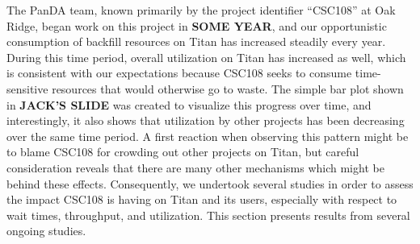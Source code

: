 

The PanDA team, known primarily by the project identifier ``CSC108'' at Oak
Ridge, began work on this project in \textbf{SOME YEAR}, and our opportunistic
consumption of backfill resources on Titan has increased steadily every year.
During this time period, overall utilization on Titan has increased as well,
which is consistent with our expectations because CSC108 seeks to consume
time-sensitive resources that would otherwise go to waste. The simple bar plot
shown in \textbf{JACK'S SLIDE} was created to visualize this progress over
time, and interestingly, it also shows that utilization by other projects has
been decreasing over the same time period. A first reaction when observing this
pattern might be to blame CSC108 for crowding out other projects on Titan, but
careful consideration reveals that there are many other mechanisms which might
be behind these effects. Consequently, we undertook several studies in order to
assess the impact CSC108 is having on Titan and its users, especially with
respect to wait times, throughput, and utilization. This section presents
results from several ongoing studies.

